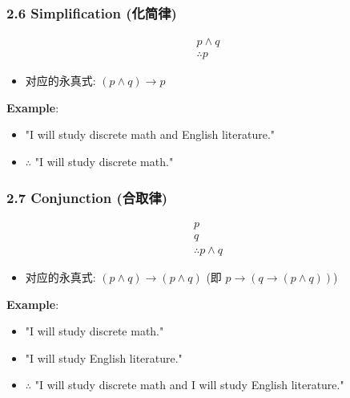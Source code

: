\documentclass[10pt,a4paper,openany]{ctexbook}
\theoremstyle{definition}
\theoremstyle{remark}
\begin{document}
\vspace{-2pt}

\subsubsection{2.6 Simplification (化简律)}

\[
\begin{array}{c}
p \land q \\
\hline
\therefore p
\end{array}
\]

\begin{itemize}
\item 对应的永真式: $(p \land q) \to p$

\end{itemize}

\textbf{Example}:
\begin{itemize}
\item "I will study discrete math and English literature."
\item $\therefore$ "I will study discrete math."

\end{itemize}

\vspace{-2pt}

\subsubsection{2.7 Conjunction (合取律)}

\[
\begin{array}{c}
p \\
q \\
\hline
\therefore p \land q
\end{array}
\]

\begin{itemize}
\item 对应的永真式: $(p \land q) \to (p \land q)$ (即 $p \to (q \to (p \land q))$)

\end{itemize}

\textbf{Example}:
\begin{itemize}
\item "I will study discrete math."
\item "I will study English literature."
\item $\therefore$ "I will study discrete math and I will study English literature."

\end{itemize}
\end{document}
